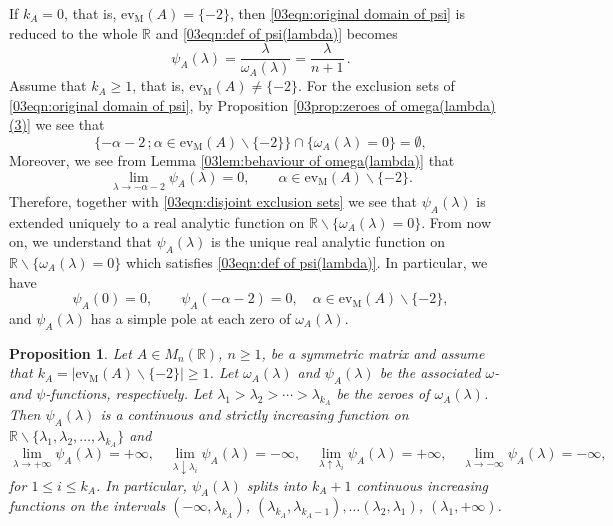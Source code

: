 \documentclass[12pt,a4paper]{article}
\newtheorem{proposition}[theorem]{Proposition}
\newcommand{\1}{{\bm 1}}
\numberwithin{equation}{section}
\begin{document}
If $k_A=0$, that is, $\mathrm{ev}_{\mathrm{M}}(A)=\{-2\}$, 
then \eqref{03eqn:original domain of psi} is reduced to
the whole  $\mathbb{R}$ and \eqref{03eqn:def of psi(lambda)} becomes
%
\begin{equation}\label{03eqn:psi for evm=-2}
\psi_A(\lambda)
=\frac{\lambda}{\omega_A(\lambda)}
=\frac{\lambda}{n+1}\,.
\end{equation}
%
Assume that $k_A\ge1$, that is, 
$\mathrm{ev}_{\mathrm{M}}(A)\neq\{-2\}$.
For the exclusion sets of \eqref{03eqn:original domain of psi},
by Proposition \ref{03prop:zeroes of omega(lambda) (3)}
we see that
%
\begin{equation}\label{03eqn:disjoint exclusion sets}
\{-\alpha-2\,;\alpha\in \mathrm{ev}_{\mathrm{M}}(A)\backslash\{-2\}\}
\cap \{\omega_A(\lambda)=0\}=\emptyset,
\end{equation}
%
Moreover, we see from Lemma \ref{03lem:behaviour of omega(lambda)} that
\[
\lim_{\lambda\rightarrow -\alpha-2}\psi_A(\lambda)=0,
\qquad
\alpha\in\mathrm{ev}_{\mathrm{M}}(A)\backslash\{-2\}.
\]
Therefore, together with \eqref{03eqn:disjoint exclusion sets}
we see that $\psi_A(\lambda)$ is extended uniquely to
a real analytic function on
$\mathbb{R}\backslash \{\omega_A(\lambda)=0\}$.
From now on, we understand that $\psi_A(\lambda)$ is the
unique real analytic function on
$\mathbb{R}\backslash \{\omega_A(\lambda)=0\}$ which
satisfies \eqref{03eqn:def of psi(lambda)}.
In particular, we have
\begin{equation}\label{03eqn:zeroes of psi}
\psi_A(0)=0,
\qquad
\psi_A(-\alpha-2)=0, 
\quad \alpha\in\mathrm{ev}_{\mathrm{M}}(A)\backslash\{-2\},
\end{equation}
and $\psi_A(\lambda)$ has a simple pole at
each zero of $\omega_A(\lambda)$.


\begin{proposition}\label{03prop:behaviour of psi(lambda)}
Let $A\in M_n(\mathbb{R})$, $n\ge1$, be a symmetric matrix
and assume that $k_A=|\mathrm{ev}_{\mathrm{M}}(A)\backslash\{-2\}|\ge1$.
Let $\omega_A(\lambda)$ and $\psi_A(\lambda)$ be the
associated $\omega$- and $\psi$-functions, respectively.
Let $\lambda_1>\lambda_2>\dotsb>\lambda_{k_A}$ be the zeroes of
$\omega_A(\lambda)$.
Then $\psi_A(\lambda)$ is a continuous and 
strictly increasing function on
$\mathbb{R}\backslash\{\lambda_1,\lambda_2,\dots, \lambda_{k_A}\}$ and
\[
\lim_{\lambda\rightarrow+\infty}\psi_A(\lambda)=+\infty,
\quad
\lim_{\lambda\downarrow \lambda_i}\psi_A(\lambda)=-\infty,
\quad
\lim_{\lambda\uparrow \lambda_i}\psi_A(\lambda)=+\infty,
\quad
\lim_{\lambda\rightarrow-\infty}\psi_A(\lambda)=-\infty,
\]
for $1\le i\le k_A$.
In particular, $\psi_A(\lambda)$ splits into $k_A+1$ 
continuous increasing functions on the intervals
$(-\infty,\lambda_{k_A})$, $(\lambda_{k_A},\lambda_{k_A-1}),
\dots (\lambda_2,\lambda_1)$, $(\lambda_1, +\infty)$.
\end{proposition}
\end{document}
